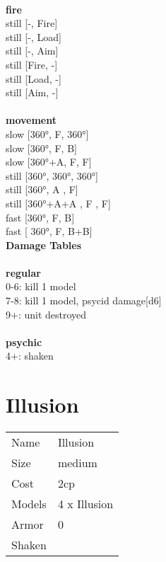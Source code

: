 \ \\ {\bf fire } \\
still [-, Fire] \\
still [-, Load] \\
still [-, Aim] \\
still [Fire, -] \\
still [Load, -] \\
still [Aim, -] \\
\ \\ {\bf movement } \\
slow [360°, F, 360°] \\
slow [360°, F, B] \\
slow [360°+A, F, F] \\
still [360°, 360°, 360°] \\
still [360°, A , F] \\
still [360°+A+A , F , F] \\
fast [360°, F, B] \\
fast [ 360°,  F, B+B] \\


{\bf Damage Tables} \\
\ \\ {\bf regular } \\
0-6: kill 1 model \\
7-8: kill 1 model, psycid damage[d6] \\
9+: unit destroyed \\
\ \\ {\bf psychic } \\
4+: shaken \\










\pagebreak\pagebreak

\section{ Illusion }

\begin{tabular}{ll}
  Name & Illusion \\
  Size & medium\\
  Cost & 2cp\\
  Models & 4 x Illusion\\
  Armor & 0\\
  Shaken & \\
\end{tabular}

